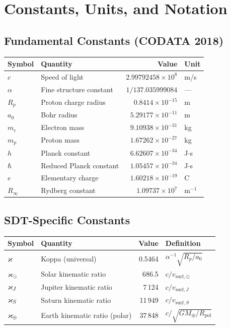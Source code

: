 \chapter{Constants, Units, and Notation}
\label{app:constants}


\section{Fundamental Constants (CODATA 2018)}

\begin{center}
\begin{tabular}{llrl}
\toprule
\textbf{Symbol} & \textbf{Quantity} & \textbf{Value} & \textbf{Unit} \\
\midrule
$c$       & Speed of light            & $2.99792458 \times 10^8$   & m/s \\
$\alpha$  & Fine structure constant   & $1/137.035999084$          & --- \\
$R_p$     & Proton charge radius      & $0.8414 \times 10^{-15}$   & m \\
$a_0$     & Bohr radius               & $5.29177 \times 10^{-11}$  & m \\
$m_e$     & Electron mass             & $9.10938 \times 10^{-31}$  & kg \\
$m_p$     & Proton mass               & $1.67262 \times 10^{-27}$  & kg \\
$h$       & Planck constant           & $6.62607 \times 10^{-34}$  & J$\cdot$s \\
$\hbar$   & Reduced Planck constant   & $1.05457 \times 10^{-34}$  & J$\cdot$s \\
$e$       & Elementary charge         & $1.60218 \times 10^{-19}$  & C \\
$R_\infty$& Rydberg constant          & $1.09737 \times 10^7$      & m$^{-1}$ \\
\bottomrule
\end{tabular}
\end{center}


\section{SDT-Specific Constants}

\begin{center}
\begin{tabular}{llrl}
\toprule
\textbf{Symbol} & \textbf{Quantity} & \textbf{Value} & \textbf{Definition} \\
\midrule
$\varkappa$            & Koppa (universal)     & 0.5464   & $\alpha^{-1}\sqrt{R_p/a_0}$ \\
$\varkappa_\odot$      & Solar kinematic ratio & 686.5    & $c/v_{\text{surf},\odot}$ \\
$\varkappa_J$          & Jupiter kinematic ratio & 7\,124 & $c/v_{\text{surf},J}$ \\
$\varkappa_S$          & Saturn kinematic ratio  & 11\,949 & $c/v_{\text{surf},S}$ \\
$\varkappa_{\oplus}$   & Earth kinematic ratio (polar) & 37\,848 & $c/\sqrt{GM_\oplus/R_{\text{pol}}}$ \\
\bottomrule
\end{tabular}
\end{center}


